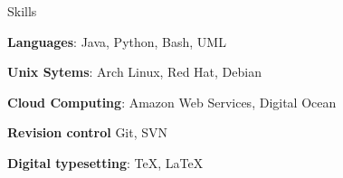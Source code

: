 \begin{cvlist}{Skills}
  \item[\textbf{Languages}:] Java, Python, Bash, UML
  \item[\textbf{Unix Sytems}:] Arch Linux, Red Hat, Debian
  \item[\textbf{Cloud Computing}:] Amazon Web Services, Digital Ocean
  \item[\textbf{Revision control}] Git, SVN
  \item[\textbf{Digital typesetting}:] \TeX, \LaTeX
\end{cvlist}